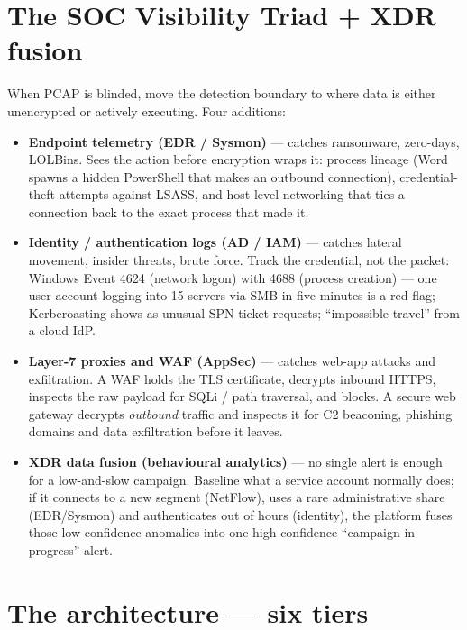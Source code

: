\documentclass[11pt,a4paper]{article}
\begin{document}
\section{The SOC Visibility Triad + XDR fusion}

When PCAP is blinded, move the detection boundary to where data is either
unencrypted or actively executing. Four additions:

\begin{itemize}
\item \textbf{Endpoint telemetry (EDR / Sysmon)} --- catches ransomware,
  zero-days, LOLBins. Sees the action before encryption wraps it: process
  lineage (Word spawns a hidden PowerShell that makes an outbound connection),
  credential-theft attempts against LSASS, and host-level networking that ties a
  connection back to the exact process that made it.
\item \textbf{Identity / authentication logs (AD / IAM)} --- catches lateral
  movement, insider threats, brute force. Track the credential, not the packet:
  Windows Event 4624 (network logon) with 4688 (process creation) --- one user
  account logging into 15 servers via SMB in five minutes is a red flag;
  Kerberoasting shows as unusual SPN ticket requests; ``impossible travel'' from
  a cloud IdP.
\item \textbf{Layer-7 proxies and WAF (AppSec)} --- catches web-app attacks and
  exfiltration. A WAF holds the TLS certificate, decrypts inbound HTTPS, inspects
  the raw payload for SQLi / path traversal, and blocks. A secure web gateway
  decrypts \emph{outbound} traffic and inspects it for C2 beaconing, phishing
  domains and data exfiltration before it leaves.
\item \textbf{XDR data fusion (behavioural analytics)} --- no single alert is
  enough for a low-and-slow campaign. Baseline what a service account normally
  does; if it connects to a new segment (NetFlow), uses a rare administrative
  share (EDR/Sysmon) and authenticates out of hours (identity), the platform
  fuses those low-confidence anomalies into one high-confidence ``campaign in
  progress'' alert.
\end{itemize}

\section{The architecture --- six tiers}
\end{document}
